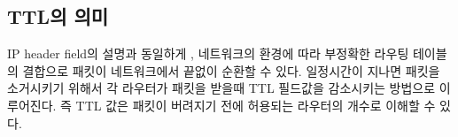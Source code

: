 \subsection{TTL의 의미}
    IP header field의 설명과 동일하게 , 네트워크의 환경에 따라 부정확한 라우팅 테이블의 결합으로 패킷이 네트워크에서 끝없이 순환할 수 있다.  일정시간이 지나면 패킷을 소거시키기 위해서 각 라우터가 패킷을 받을때 TTL 필드값을 감소시키는 방법으로 이루어진다. 즉 TTL 값은 패킷이 버려지기 전에 허용되는 라우터의 개수로 이해할 수 있다.